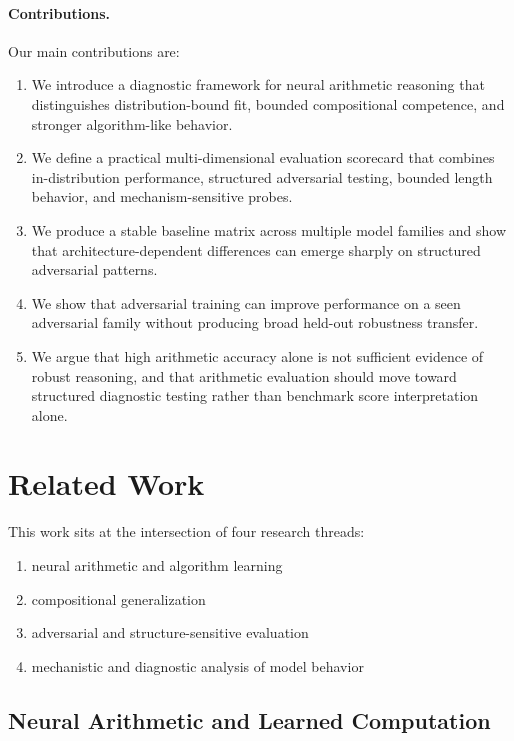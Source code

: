 \documentclass[11pt]{article}
\begin{document}
\paragraph{Contributions.}
Our main contributions are:
\begin{enumerate}[leftmargin=1.5em]
    \item We introduce a diagnostic framework for neural arithmetic reasoning that distinguishes distribution-bound fit, bounded compositional competence, and stronger algorithm-like behavior.
    \item We define a practical multi-dimensional evaluation scorecard that combines in-distribution performance, structured adversarial testing, bounded length behavior, and mechanism-sensitive probes.
    \item We produce a stable baseline matrix across multiple model families and show that architecture-dependent differences can emerge sharply on structured adversarial patterns.
    \item We show that adversarial training can improve performance on a seen adversarial family without producing broad held-out robustness transfer.
    \item We argue that high arithmetic accuracy alone is not sufficient evidence of robust reasoning, and that arithmetic evaluation should move toward structured diagnostic testing rather than benchmark score interpretation alone.
\end{enumerate}

\section{Related Work}

This work sits at the intersection of four research threads:
\begin{enumerate}[leftmargin=1.5em]
    \item neural arithmetic and algorithm learning
    \item compositional generalization
    \item adversarial and structure-sensitive evaluation
    \item mechanistic and diagnostic analysis of model behavior
\end{enumerate}

\subsection{Neural Arithmetic and Learned Computation}
\end{document}

